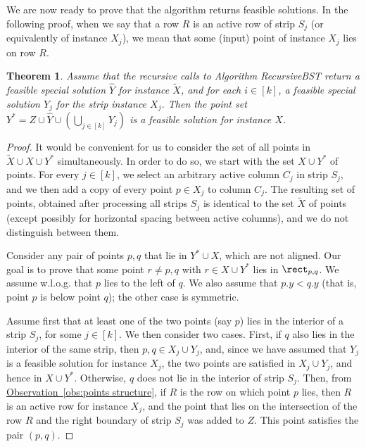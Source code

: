 \documentclass[11pt]{article}
\numberwithin{equation}{section}
\newtheorem{theorem}{Theorem}[section]
\theoremstyle{definition}
\theoremstyle{plain}
\newcommand{\expref}[2]{\hyperref[#2]{#1~\ref{#2}}}
\begin{document}
We are now ready to prove that the algorithm returns feasible solutions.
In the following proof, when we say that a row $R$ is an active row of strip $S_j$ (or equivalently of instance $X_j$), we mean that some (input) point of instance $X_j$ lies on row $R$.


\begin{theorem} \label{thm: algorithm feasibility}
	Assume that the recursive calls to Algorithm {\sc RecursiveBST} return a feasible special solution $\hat Y$ for instance $\widetilde{X}$, and for each $i\in [k]$, a feasible special solution $Y_j$ for the strip instance $X_j$. Then the point set $Y^*=Z \cup \hat{Y} \cup (\bigcup_{j \in [k]} Y_j)$ is a feasible solution for instance $X$. 
\end{theorem}

\begin{proof}
	It would be convenient for us to consider the set of all points in  $\widetilde{X}\cup X\cup Y^*$ simultaneously. 
	In order to do so, we start with the set $X\cup Y^*$ of points. For every $j \in [k]$, we select an arbitrary active column $C_j$ in strip $S_j$, and we then add a copy of every point $p\in X_j$ to column $C_j$. The resulting set of points, obtained after processing all strips $S_j$ is identical to the set $\widetilde{X}$ of points (except possibly for horizontal spacing between active columns), and we do not distinguish between them.  
	
	
	Consider any pair of points $p,q$ that lie in $Y^*\cup X$, which are not aligned. Our goal is to prove that some point $r\neq p,q$ with $r\in X\cup Y^*$ lies in $\rect_{p,q}$. We assume w.l.o.g. that $p$ lies to the left of $q$. We also assume that $p.y<q.y$ (that is, point $p$ is below point $q$); the other case is symmetric.
	
	Assume first that at least one of the two points (say $p$) lies in the interior of a strip $S_j$, for some $j \in [k]$. We then consider two cases. First, if $q$ also lies in the interior of the same strip, then $p,q\in X_j \cup Y_j$, and, since we have assumed that $Y_j$ is a feasible solution for instance $X_j$, the two points are satisfied in $X_j\cup Y_j$, and hence in $X\cup Y^*$. Otherwise, $q$ does not lie in the interior of strip $S_j$. Then, from \expref{Observation}{obs:points structure}, if $R$ is the row on which point $p$ lies, then $R$ is an active row for instance $X_j$, and the point that lies on the intersection of the row $R$ and the right boundary of strip $S_j$ was added to $Z$. This point satisfies the pair $(p,q)$.


\end{proof}
\end{document}
